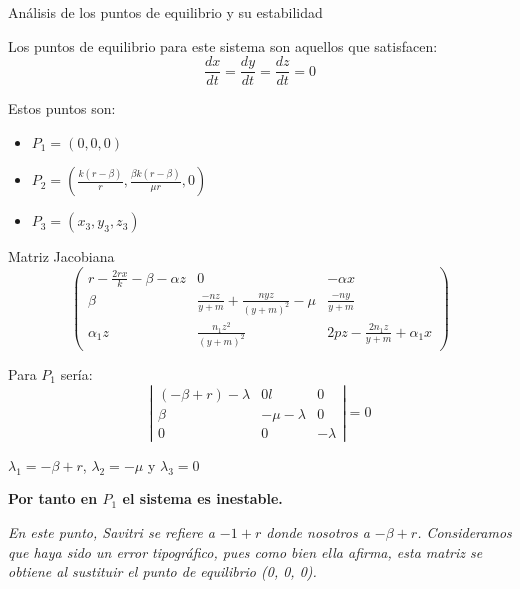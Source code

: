 \documentclass{beamer}
\begin{document}
\begin{frame}{Análisis de los puntos de equilibrio y su estabilidad}

    Los puntos de equilibrio para este sistema son aquellos que satisfacen:
    $$\frac{dx}{dt}=\frac{dy}{dt}=\frac{dz}{dt}=0$$

    Estos puntos son:
    \begin{itemize}
        \item $P_1=(0, 0, 0)$
        \item $P_2=(\frac{k(r-\beta)}{r}, \frac{\beta k(r-\beta)}{\mu r}, 0)$
        \item $P_3=(x_3, y_3, z_3)$
    \end{itemize}
\end{frame}

\begin{frame}
    {Matriz Jacobiana}
    $$\left(
        \begin{array}{ccc}
                r-\frac{2rx}{k}-\beta-\alpha z & 0                                       & -\alpha x                       \\
                \beta                          & \frac{-nz}{y+m}+\frac{nyz}{(y+m)^2}-\mu & \frac{-ny}{y+m}                 \\
                \alpha_1z                      & \frac{n_1z^2}{(y+m)^2}                  & 2pz-\frac{2n_1z}{y+m}+\alpha_1x
            \end{array}
        \right)$$
\end{frame}

\begin{frame}
    Para $P_1$ sería:
    $$\left|
        \begin{array}{ccc}
            (-\beta+r)-\lambda & 0      l     & 0        \\
            \beta              & -\mu-\lambda & 0        \\
            0                  & 0            & -\lambda
        \end{array}
        \right| =0$$

    $\lambda_1=-\beta+r$, $\lambda_2 = -\mu$ y $\lambda_3=0$

    {\bf Por tanto en $P_1$ el sistema es inestable.}
    \vspace*{0.7cm}

    {\it\scriptsize En este punto, Savitri se refiere a $-1+r$ donde nosotros a $-\beta+r$. Consideramos que haya sido un error tipográfico, pues como bien ella
        afirma, esta matriz se obtiene al sustituir el punto de equilibrio (0, 0, 0).}

\end{frame}
\end{document}
